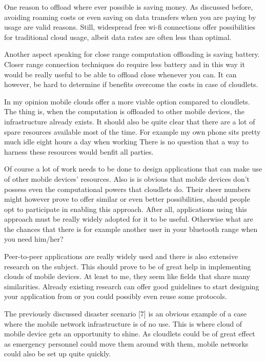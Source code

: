 \documentclass[conference]{IEEEtran}
\begin{document}
\par
One reason to offload where ever possible is saving money. As discussed before, avoiding roaming costs or even saving on data transfers when you are paying by usage are valid reasons. Still, widespread free wi-fi connections offer possibilities for traditional cloud usage, albeit data rates are often less than optimal.
\par
Another aspect speaking for close range computation offloading is saving battery.  Closer range connection techniques do require less battery and in this way it would be really useful to be able to offload close whenever you can. It can however, be hard to determine if benefits overcome the costs in case of cloudlets.
\par
In my opinion mobile clouds offer a more viable option compared to cloudlets. The thing is, when the computation is offloaded to other mobile devices, the infrastructure already exists. It should also be quite clear that there are a lot of spare resources available most of the time. For example my own phone sits pretty much idle eight hours a day when working There is no question that a way to harness these resources would benfit all parties.
\par
Of course a lot of work needs to be done to design applications that can make use of other mobile devices' resources. Also is is obvious that mobile devices don't possess even the computational powers that cloudlets do. Their sheer numbers might however prove to offer similar or even better possibilities, should people opt to participate in enabling this approach. After all, applications using this approach must be really widely adopted for it to be useful. Otherwise what are the chances that there is for example another user in your bluetooth range when you need him/her?
\par
Peer-to-peer applications are really widely used and there is also extensive research on the subject. This should prove to be of great help in implementing clouds of mobile devices. At least to me, they seem like fields that share many similarities. Already existing research can offer good guidelines to start designing your application from or you could possibly even reuse some protocols.
\par
The previously discussed disaster scenario [7] is an obvious example of a case where the mobile network infrastructure is of no use. This is where cloud of mobile device gets an opportunity to shine. As cloudlets could be of great effect as emergency personnel could move them around with them, mobile networks could also be set up quite quickly.
\end{document}
